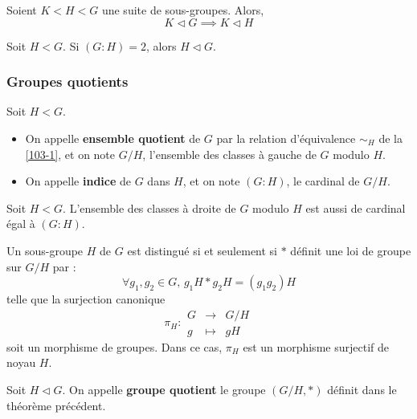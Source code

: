 
	\begin{proposition}
		Soient $K < H < G$ une suite de sous-groupes. Alors,
		\[ K \lhd G \implies K \lhd H \]
	\end{proposition}


	\begin{proposition}
		Soit $H < G$. Si $(G:H) = 2$, alors $H \lhd G$.
	\end{proposition}

	\subsubsection{Groupes quotients}


	\begin{definition}
		Soit $H < G$.
		\begin{itemize}
			\item On appelle \textbf{ensemble quotient} de $G$ par la relation d'équivalence $\sim_H$ de la \cref{103-1}, et on note $G/H$, l'ensemble des classes à gauche de $G$ modulo $H$.
			\item On appelle \textbf{indice} de $G$ dans $H$, et on note $(G:H)$, le cardinal de $G/H$.
		\end{itemize}
	\end{definition}

	\begin{proposition}
		Soit $H < G$. L'ensemble des classes à droite de $G$ modulo $H$ est aussi de cardinal égal à $(G:H)$.
	\end{proposition}


	\begin{theorem}
		Un sous-groupe $H$ de $G$ est distingué si et seulement si $*$ définit une loi de groupe sur $G/H$ par :
		\[ \forall g_1, g_2 \in G, \, g_1 H * g_2 H = (g_1 g_2) H \]
		telle que la surjection canonique
		\[
			\pi_H :
			\begin{array}{ccc}
				G &\rightarrow& G/H \\
				g &\mapsto& gH
			\end{array}
		\]
		soit un morphisme de groupes. Dans ce cas, $\pi_H$ est un morphisme surjectif de noyau $H$.
	\end{theorem}

	\begin{definition}
		Soit $H \lhd G$. On appelle \textbf{groupe quotient} le groupe $(G/H, *)$ définit dans le théorème précédent.
	\end{definition}

